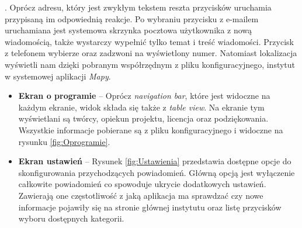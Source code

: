 \documentclass{iiuwb}
\begin{document}
\begin{itemize}
                                                                                                                                                                                                                                                          . Oprócz adresu, który jest zwykłym tekstem reszta przycisków uruchamia przypisaną im odpowiednią reakcje. Po wybraniu przycisku z e-mailem uruchamiana jest systemowa skrzynka pocztowa użytkownika z nową wiadomością, także wystarczy wypełnić tylko temat i treść wiadomości. Przycisk z telefonem wybierze oraz zadzwoni na wyświetlony numer. Natomiast lokalizacja wyświetli nam dzięki pobranym współrzędnym z pliku konfiguracyjnego, instytut w systemowej aplikacji \textit{Mapy}. 
\end{itemize}
\newpage

\begin{itemize}

\item \textbf{Ekran o programie} -- Oprócz \textit{navigation bar}, które jest widoczne na każdym ekranie, widok składa się także z \textit{table view}. Na ekranie tym wyświetlani są twórcy, opiekun projektu, licencja oraz podziękowania. Wszystkie informacje pobierane są z pliku konfiguracyjnego i widoczne na rysunku  \ref{fig:Oprogramie}.
\item \textbf{Ekran ustawień} -- Rysunek \ref{fig:Ustawienia} przedstawia dostępne opcje do skonfigurowania przychodzących powiadomień. Główną opcją jest wyłączenie całkowite powiadomień co spowoduje ukrycie dodatkowych ustawień. Zawierają one częstotliwość z jaką aplikacja ma sprawdzać czy nowe informacje pojawiły się na stronie głównej instytutu oraz listę przycisków wyboru dostępnych kategorii.
\end{itemize}
\end{document}
